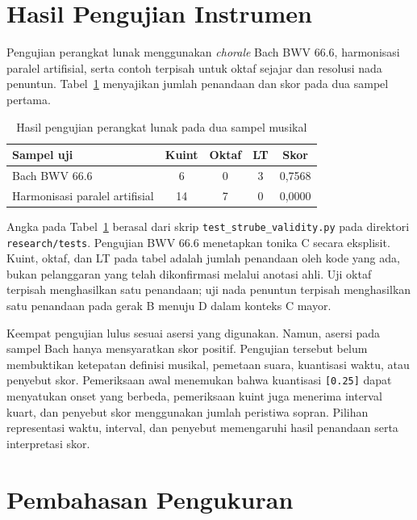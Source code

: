 \section{Hasil Pengujian Instrumen}

Pengujian perangkat lunak menggunakan \textit{chorale} Bach BWV 66.6, harmonisasi paralel artifisial, serta contoh terpisah untuk oktaf sejajar dan resolusi nada penuntun. Tabel~\ref{tab:pengujian-awal} menyajikan jumlah penandaan dan skor pada dua sampel pertama.

\begin{table}[htbp]
\centering
\small
\begin{tabularx}{\textwidth}{|X|c|c|c|c|}
\hline
\textbf{Sampel uji} & \textbf{Kuint} & \textbf{Oktaf} & \textbf{LT} & \textbf{Skor} \\ \hline
Bach BWV 66.6 & 6 & 0 & 3 & 0,7568 \\ \hline
Harmonisasi paralel artifisial & 14 & 7 & 0 & 0,0000 \\ \hline
\end{tabularx}
\caption{Hasil pengujian perangkat lunak pada dua sampel musikal}
\label{tab:pengujian-awal}
\end{table}

Angka pada Tabel~\ref{tab:pengujian-awal} berasal dari skrip \texttt{test\_strube\_validity.py} pada direktori \texttt{research/tests}. Pengujian BWV 66.6 menetapkan tonika C secara eksplisit. Kuint, oktaf, dan LT pada tabel adalah jumlah penandaan oleh kode yang ada, bukan pelanggaran yang telah dikonfirmasi melalui anotasi ahli. Uji oktaf terpisah menghasilkan satu penandaan; uji nada penuntun terpisah menghasilkan satu penandaan pada gerak B menuju D dalam konteks C mayor.

Keempat pengujian lulus sesuai asersi yang digunakan. Namun, asersi pada sampel Bach hanya mensyaratkan skor positif. Pengujian tersebut belum membuktikan ketepatan definisi musikal, pemetaan suara, kuantisasi waktu, atau penyebut skor. Pemeriksaan awal menemukan bahwa kuantisasi \texttt{[0.25]} dapat menyatukan onset yang berbeda, pemeriksaan kuint juga menerima interval kuart, dan penyebut skor menggunakan jumlah peristiwa sopran. Pilihan representasi waktu, interval, dan penyebut memengaruhi hasil penandaan serta interpretasi skor.

\section{Pembahasan Pengukuran}


